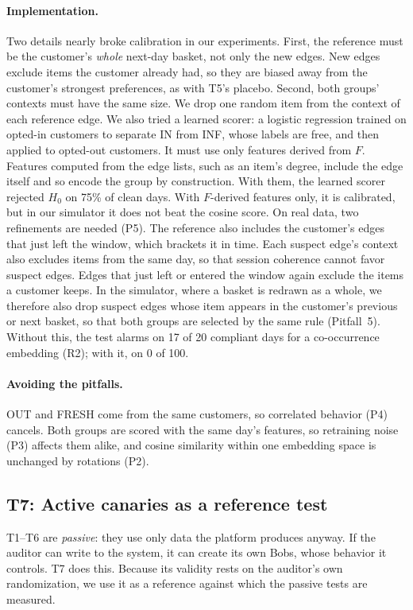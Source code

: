 \documentclass[10pt,twocolumn,letterpaper]{article}
\theoremstyle{definition}
\begin{document}
\paragraph{Implementation.}
Two details nearly broke calibration in our experiments. First, the reference
must be the customer's \emph{whole} next-day basket, not only the new edges. New
edges exclude items the customer already had, so they are biased away from
the customer's strongest preferences, as with T5's placebo. Second, both
groups' contexts must have the same size. We drop one random item from the
context of each reference edge. We also tried a learned scorer: a logistic
regression trained on opted-in customers to separate IN from INF, whose labels
are free, and then applied to opted-out customers. It must use only features
derived from $F$. Features computed from the edge lists, such as an item's
degree, include the edge itself and so encode the group by construction. With
them, the learned scorer rejected $H_0$ on 75\% of clean days. With $F$-derived
features only, it is calibrated, but in our simulator it does not beat the
cosine score. On real data, two refinements are needed (P5). The reference
also includes the customer's edges that just left the window, which brackets
it in time. Each suspect edge's context also excludes items from the same day,
so that session coherence cannot favor suspect edges. Edges that just left or
entered the window again exclude the items a customer keeps. In the simulator,
where a basket is redrawn as a whole, we therefore also drop suspect edges
whose item appears in the customer's previous or next basket, so that both
groups are selected by the same rule (Pitfall~5). Without this, the test
alarms on 17 of 20 compliant days for a co-occurrence embedding (R2); with it,
on 0 of 100.

\paragraph{Avoiding the pitfalls.}
OUT and FRESH come from the same customers, so correlated behavior (P4)
cancels. Both groups are scored with the same day's features, so retraining
noise (P3) affects them alike, and cosine similarity within one embedding
space is unchanged by rotations (P2).

\subsection{T7: Active canaries as a reference test}
T1--T6 are \emph{passive}: they use only data the platform produces anyway. If
the auditor can write to the system, it can create its own Bobs, whose
behavior it controls. T7 does this. Because its validity rests on the
auditor's own randomization, we use it as a reference against which the
passive tests are measured.
\end{document}
